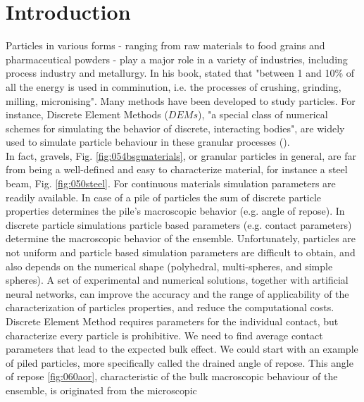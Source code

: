 
\part{Introduction}
\label{par:introduction}

Particles in various forms - ranging from raw materials to food grains and pharmaceutical powders - 
play a major role in a variety of industries, including process industry and metallurgy. 
In his book, \citet{RefWorks:117} stated that "between 1 and 10\% of all the energy is used in 
comminution, i.e. the processes of crushing, grinding, milling, micronising". 
Many methods have been developed to study particles.
For instance, Discrete Element Methods ($DEMs$), "a special class of numerical
schemes for simulating the behavior of discrete, interacting bodies", are widely used to 
simulate particle behaviour in these granular processes
(\citet{RefWorks:130}).\\ 


In fact, gravels, Fig. \ref{fig:054bsgmaterials}, or granular particles in
general, are far from being a well-defined and easy to characterize material,
for instance a steel beam, Fig.
\ref{fig:050steel}. For continuous materials simulation
parameters are readily available.
In case of a pile of particles the sum of discrete particle properties determines the pile's macroscopic behavior 
(e.g. angle of repose).
In discrete particle simulations particle based parameters (e.g. contact parameters) determine the macroscopic behavior 
of the ensemble.
Unfortunately, particles are not uniform and particle based simulation
parameters are difficult to obtain, and also depends on the numerical shape
(polyhedral, multi-spheres, and simple spheres).
A set of experimental and numerical solutions, together with artificial neural networks, can improve the accuracy 
and the range of applicability of the characterization of particles properties, and reduce the computational costs.
Discrete Element Method requires parameters for the individual contact, but characterize every particle is prohibitive.
We need to find average contact parameters that lead to the expected bulk effect.
We could start with an example of piled particles, more specifically called the
drained angle of repose. This angle of repose \ref{fig:060aor},
characteristic of the bulk macroscopic behaviour of the ensemble, is originated from the microscopic

